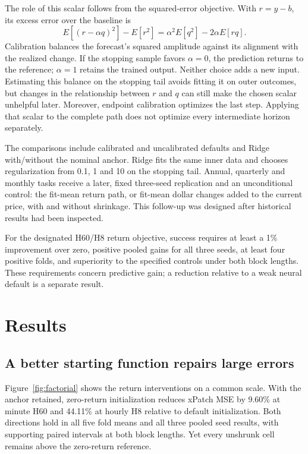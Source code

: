 The role of this scalar follows from the squared-error objective. With \(r=y-b\), its excess error over the baseline is
\[
E[(r-\alpha q)^2]-E[r^2]
 =\alpha^2E[q^2]-2\alpha E[rq].
\]
Calibration balances the forecast's squared amplitude against its alignment with the realized change. If the stopping sample favors \(\alpha=0\), the prediction returns to the reference; \(\alpha=1\) retains the trained output. Neither choice adds a new input. Estimating this balance on the stopping tail avoids fitting it on outer outcomes, but changes in the relationship between \(r\) and \(q\) can still make the chosen scalar unhelpful later. Moreover, endpoint calibration optimizes the last step. Applying that scalar to the complete path does not optimize every intermediate horizon separately.

The comparisons include calibrated and uncalibrated defaults and Ridge with/without the nominal anchor. Ridge fits the same inner data and chooses regularization from 0.1, 1 and 10 on the stopping tail. Annual, quarterly and monthly tasks receive a later, fixed three-seed replication and an unconditional control: the fit-mean return path, or fit-mean dollar changes added to the current price, with and without shrinkage. This follow-up was designed after historical results had been inspected.

For the designated H60/H8 return objective, success requires at least a 1\% improvement over zero, positive pooled gains for all three seeds, at least four positive folds, and superiority to the specified controls under both block lengths. These requirements concern predictive gain; a reduction relative to a weak neural default is a separate result.

\section{Results}\label{sec:results}

\subsection{A better starting function repairs large errors}

Figure~\ref{fig:factorial} shows the return interventions on a common scale. With the anchor retained, zero-return initialization reduces xPatch MSE by 9.60\% at minute H60 and 44.11\% at hourly H8 relative to default initialization. Both directions hold in all five fold means and all three pooled seed results, with supporting paired intervals at both block lengths. Yet every unshrunk cell remains above the zero-return reference.

